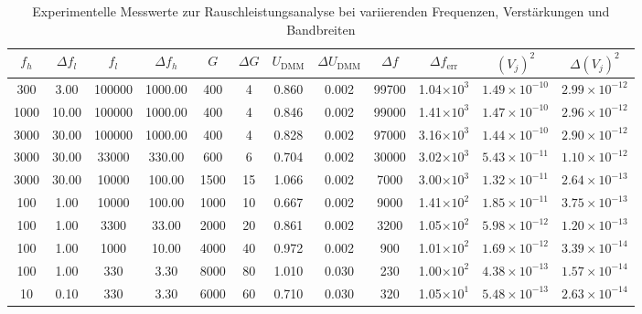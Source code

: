 \begin{table}[h!]
\centering
\begin{adjustbox}{width=0.9\textwidth}
\begin{tabular}{|c|c|c|c|c|c|c|c|c|c|c|c|}
\hline
$f_h$ & $\Delta f_l$ & $f_l$ & $\Delta f_h$ & $G$ & $\Delta G$ & $U_{\mathrm{DMM}}$ & $\Delta U_{\mathrm{DMM}}$ & $\Delta f$ & $\Delta f_{\text{err}}$ & $(V_j)^2$ & $\Delta (V_j)^2$ \\
\hline
300    & 3.00   & 100000  & 1000.00  & 400   & 4   & 0.860  & 0.002 & 99700  & 1.04$\times10^{3}$ & $1.49\times10^{-10}$ & $2.99\times10^{-12}$ \\
1000   & 10.00  & 100000  & 1000.00  & 400   & 4   & 0.846  & 0.002 & 99000  & 1.41$\times10^{3}$ & $1.47\times10^{-10}$ & $2.96\times10^{-12}$ \\
3000   & 30.00  & 100000  & 1000.00  & 400   & 4   & 0.828  & 0.002 & 97000  & 3.16$\times10^{3}$ & $1.44\times10^{-10}$ & $2.90\times10^{-12}$ \\
3000   & 30.00  & 33000   & 330.00   & 600   & 6   & 0.704  & 0.002 & 30000  & 3.02$\times10^{3}$ & $5.43\times10^{-11}$ & $1.10\times10^{-12}$ \\
3000   & 30.00  & 10000   & 100.00   & 1500  & 15  & 1.066  & 0.002 & 7000   & 3.00$\times10^{3}$ & $1.32\times10^{-11}$ & $2.64\times10^{-13}$ \\
100    & 1.00   & 10000   & 100.00   & 1000  & 10  & 0.667  & 0.002 & 9000   & 1.41$\times10^{2}$ & $1.85\times10^{-11}$ & $3.75\times10^{-13}$ \\
100    & 1.00   & 3300    & 33.00    & 2000  & 20  & 0.861  & 0.002 & 3200   & 1.05$\times10^{2}$ & $5.98\times10^{-12}$ & $1.20\times10^{-13}$ \\
100    & 1.00   & 1000    & 10.00    & 4000  & 40  & 0.972  & 0.002 & 900    & 1.01$\times10^{2}$ & $1.69\times10^{-12}$ & $3.39\times10^{-14}$ \\
100    & 1.00   & 330     & 3.30     & 8000  & 80  & 1.010  & 0.030 & 230    & 1.00$\times10^{2}$ & $4.38\times10^{-13}$ & $1.57\times10^{-14}$ \\
10     & 0.10   & 330     & 3.30     & 6000  & 60  & 0.710  & 0.030 & 320    & 1.05$\times10^{1}$ & $5.48\times10^{-13}$ & $2.63\times10^{-14}$ \\
\hline
\end{tabular}
\end{adjustbox}
\caption{Experimentelle Messwerte zur Rauschleistungsanalyse bei variierenden Frequenzen, Verstärkungen und Bandbreiten}
\label{tab:gerundet}
\end{table}

